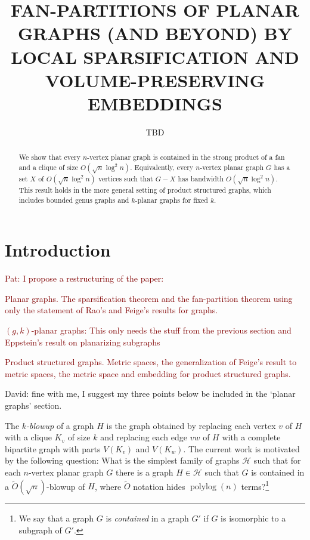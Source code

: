 \documentclass{patmorin}
\title{\MakeUppercase{Fan-Partitions of Planar Graphs (and Beyond)
  \newline by Local Sparsification and Volume-Preserving Embeddings}}
\author{TBD}
\date{}
\newcommand{\david}[1]{{\color{orange} David: #1}}
\newcommand{\pat}[1]{\textcolor{Maroon}{Pat: #1}}
\newcommand{\defin}[1]{\emph{\textcolor{brightmaroon}{#1}}}
\DeclareMathOperator{\polylog}{polylog}
\begin{document}
\maketitle

\begin{abstract}
  We show that every $n$-vertex planar graph is contained in the strong product of a fan and a clique of size $O(\sqrt{n}\log^2 n)$.  Equivalently, every $n$-vertex planar graph $G$ has a set $X$ of $O(\sqrt{n}\log^2 n)$ vertices such that $G-X$ has bandwidth $O(\sqrt{n}\log^2 n)$.  This result holds in the more general setting of product structured graphs, which includes bounded genus graphs and $k$-planar graphs for fixed $k$.
\end{abstract}

\section{Introduction}

\pat{I propose a restructuring of the paper:
\begin{compactenum}
    \item Planar graphs. The sparsification theorem and the fan-partition theorem using only the statement of Rao's and Feige's results for graphs.
    \item $(g,k)$-planar graphs:  This only needs the stuff from the previous section and Eppstein's result on planarizing subgraphs
    \item Product structured graphs. Metric spaces,  the generalization of Feige's result to metric spaces, the metric space and embedding for product structured graphs.
\end{compactenum}}

\david{fine with me, I suggest my three points below be included in the `planar graphs' section. }

The \defin{$k$-blowup} of a graph $H$ is the graph obtained by replacing each vertex $v$ of $H$ with a clique $K_v$ of size $k$ and replacing each edge $vw$ of $H$ with a complete bipartite graph with parts $V(K_v)$ and $V(K_w)$.  The current work is motivated by the following question: What is the simplest family of graphs $\mathcal{H}$ such that for each $n$-vertex planar graph $G$ there is a graph $H\in\mathcal{H}$ such that $G$ is contained in a $\tilde{O}(\sqrt{n})$-blowup of $H$, where $\tilde{O}$ notation hides $\polylog(n)$ terms?\footnote{We say that a graph $G$ is \defin{contained} in a graph $G'$ if $G$ is isomorphic to a subgraph of $G'$.}
\end{document}
